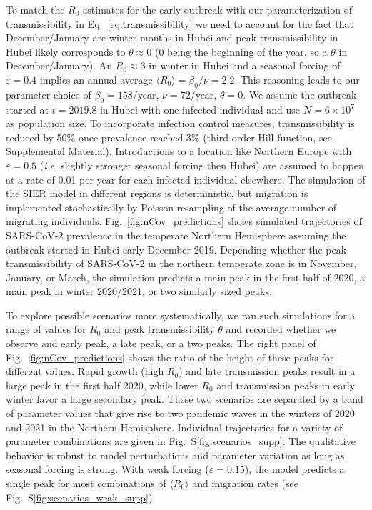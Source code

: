 \documentclass[rmp, reprint, superscriptaddress, floatfix,amsmath]{revtex4-1}
\newcommand{\forcing}{\varepsilon}
\begin{document}
To match the $R_0$ estimates for the early outbreak with our parameterization of transmissibility in Eq.~\ref{eq:transmissibility} we need to account for the fact that December/January are winter months in Hubei and peak transmissibility in Hubei likely corresponds to $\theta\approx 0$ (0 being the beginning of the year, so a $\theta$ in December/January). An $R_0\approx 3$ in winter in Hubei and a seasonal forcing of $\forcing=0.4$ implies an annual average $\langle R_0\rangle = \beta_0/\nu=2.2$.
This reasoning leads to our parameter choice of $\beta_0=158$/year, $\nu=72$/year, $\theta=0$.
We assume the outbreak started at $t=2019.8$ in Hubei with one infected individual and use $N=6\times 10^{7}$ as population size.
To incorporate infection control measures, transmissibility is reduced by 50\% once prevalence reached 3\% (third order Hill-function, see Supplemental Material).
Introductions to a location like Northern Europe with $\forcing=0.5$ (\textit{i.e.} slightly stronger seasonal forcing then Hubei) are assumed to happen at a rate of 0.01 per year for each infected individual elsewhere.
The simulation of the SIER model in different regions is deterministic, but migration is implemented stochastically by Poisson resampling of the average number of migrating individuals.
Fig.~\ref{fig:nCov_predictions} shows simulated trajectories of SARS-CoV-2 prevalence in the temperate Northern Hemisphere assuming the outbreak started in Hubei early December 2019.
Depending whether the peak transmissibility of SARS-CoV-2 in the northern temperate zone is in November, January, or March, the simulation predicts a main peak in the first half of 2020, a main peak in winter 2020/2021, or two similarly sized peaks.

To explore possible scenarios more systematically, we ran such simulations for a range of values for $R_0$ and peak transmissibility $\theta$ and recorded whether we observe and early peak, a late peak, or a two peaks.
The right panel of Fig.~\ref{fig:nCov_predictions} shows the ratio of the height of these peaks for different values.
Rapid growth (high $R_0$) and late transmission peaks result in a large peak in the first half 2020, while lower $R_0$ and transmission peaks in early winter favor a large secondary peak.
These two scenarios are separated by a band of parameter values that give rise to two pandemic waves in the winters of 2020 and 2021 in the Northern Hemisphere.
Individual trajectories for a variety of parameter combinations are given in Fig.~S\ref{fig:scenarios_supp}.
The qualitative behavior is robust to model perturbations and parameter variation as long as seasonal forcing is strong.
With weak forcing ($\forcing=0.15$), the model predicts a single peak for most combinations of $\langle R_0 \rangle$ and migration rates (see Fig.~S\ref{fig:scenarios_weak_supp}).
\end{document}
